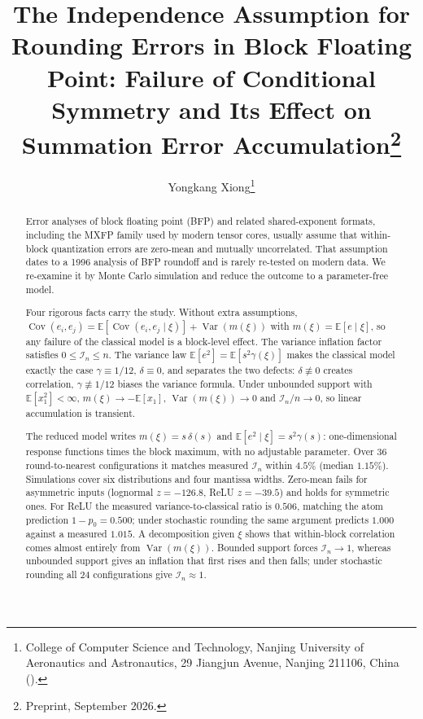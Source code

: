 \documentclass[review,hidelinks,oneeqnum,onetabnum,onefignum,onethmnum]{siamart251216}
\title{The Independence Assumption for Rounding Errors in Block Floating
Point: Failure of Conditional Symmetry and Its Effect on Summation Error
Accumulation\thanks{Preprint, September 2026.
\funding{The author received no external funding for this work.}}}
\author{Yongkang Xiong\thanks{College of Computer Science and Technology,
Nanjing University of Aeronautics and Astronautics, 29 Jiangjun Avenue,
Nanjing 211106, China (\email{nuaapanda@outlook.com}).}}
\begin{document}
\maketitle

\begin{abstract}
Error analyses of block floating point (BFP) and related shared-exponent formats,
including the MXFP family used by modern tensor cores, usually assume that
within-block quantization errors are zero-mean and mutually uncorrelated. That
assumption dates to a 1996 analysis of BFP roundoff and is rarely re-tested on
modern data. We re-examine it by Monte Carlo simulation and reduce the outcome to
a parameter-free model.

Four rigorous facts carry the study. Without extra assumptions,
$\operatorname{Cov}(e_i,e_j)=\mathbb{E}[\operatorname{Cov}(e_i,e_j\mid\xi)]
+\operatorname{Var}(m(\xi))$ with $m(\xi)=\mathbb{E}[e\mid\xi]$, so any failure of
the classical model is a block-level effect. The variance inflation factor
satisfies $0\le\mathcal I_n\le n$. The variance law
$\mathbb{E}[e^2]=\mathbb{E}[s^2\gamma(\xi)]$ makes the classical model exactly the
case $\gamma\equiv1/12$, $\delta\equiv0$, and separates the two defects:
$\delta\not\equiv0$ creates correlation, $\gamma\not\equiv1/12$ biases the
variance formula. Under unbounded support with $\mathbb{E}[x_1^2]<\infty$,
$m(\xi)\to-\mathbb{E}[x_1]$, $\operatorname{Var}(m(\xi))\to0$ and
$\mathcal I_n/n\to0$, so linear accumulation is transient.

The reduced model writes $m(\xi)=s\,\delta(s)$ and
$\mathbb{E}[e^2\mid\xi]=s^2\gamma(s)$: one-dimensional response functions times
the block maximum, with no adjustable parameter. Over 36 round-to-nearest
configurations it matches measured $\mathcal I_n$ within $4.5\%$ (median
$1.15\%$). Simulations cover six distributions and four mantissa widths. Zero-mean
fails for asymmetric inputs (lognormal $z=-126.8$, ReLU $z=-39.5$) and holds for
symmetric ones. For ReLU the measured variance-to-classical ratio is $0.506$,
matching the atom prediction $1-p_0=0.500$; under stochastic rounding the same
argument predicts $1.000$ against a measured $1.015$. A decomposition given $\xi$
shows that within-block correlation comes almost entirely from
$\operatorname{Var}(m(\xi))$. Bounded support forces $\mathcal I_n\to1$, whereas
unbounded support gives an inflation that first rises and then falls; under
stochastic rounding all $24$ configurations give $\mathcal I_n\approx1$.
\end{abstract}
\end{document}
